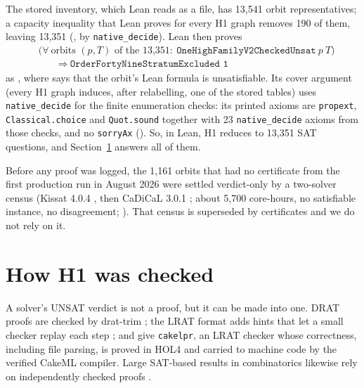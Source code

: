 \documentclass{anvil-paper}
\newcommand{\repocommit}{2029149d7e42b74036ff0e1e82af6d33c2e32748}%
\newcommand{\repocommitshort}{2029149d7e42}
\newcommand{\repobase}{https://github.com/rjwalters/lean-genius/blob/\repocommit}
\newcommand{\repofile}[2]{\href{\repobase/#1}{\lean{#2}}}
\newcommand{\rp}{research/problems/erdos-85-wip-01}
\newcommand{\cakelpr}{\texttt{cake\textunderscore lpr}}
\theoremstyle{definition}
\begin{document}
The stored inventory, which Lean reads as a file, has 13,541 orbit representatives; a capacity inequality that Lean proves for every H1 graph removes 190 of them, leaving 13,351 (, by \texttt{native\_decide}). Lean then proves
\[
\begin{aligned}
&\bigl(\forall\ \text{orbits } (p,T) \text{ of the 13,351}:\ \texttt{OneHighFamilyV2CheckedUnsat}\ p\ T\bigr)\\
&\qquad\Longrightarrow\ \texttt{OrderFortyNineStratumExcluded 1}
\end{aligned}
\]
as , where  says that the orbit's Lean formula is unsatisfiable. Its cover argument (every H1 graph induces, after relabelling, one of the stored tables) uses \texttt{native\_decide} for the finite enumeration checks: its printed axioms are \texttt{propext}, \texttt{Classical.choice} and \texttt{Quot.sound} together with 23 \texttt{native\_decide} axioms from those checks, and no \texttt{sorryAx} (\repofile{\rp/h1_cert_pilot_20261001/H1_COVER_AXIOMS_20261006.txt}{H1_COVER_AXIOMS_20261006.txt}). So, in Lean, H1 reduces to 13,351 SAT questions, and Section~\ref{sec:h1} answers all of them.

Before any proof was logged, the 1,161 orbits that had no certificate from the first production run in August 2026 were settled verdict-only by a two-solver census (Kissat 4.0.4 \citep{biere2024kissat}, then CaDiCaL 3.0.1 \citep{biere2020cadical,biere2024cadical2}; about 5,700 core-hours, no satisfiable instance, no disagreement; \repofile{\rp/phase_b_h1_census_20260927/CENSUS.md}{CENSUS.md}). That census is superseded by certificates and we do not rely on it.

\section{How H1 was checked}\label{sec:h1}

A solver's UNSAT verdict is not a proof, but it can be made into one. DRAT proofs are checked by drat-trim \citep{wetzler2014drat}; the LRAT format adds hints that let a small checker replay each step \citep{cruzfilipe2017lrat}; and \citet{tan2021cakelpr} give \cakelpr{}, an LRAT checker whose correctness, including file parsing, is proved in HOL4 and carried to machine code by the verified CakeML compiler. Large SAT-based results in combinatorics likewise rely on independently checked proofs \citep{heule2016pythagorean,heule2018schur}.
\end{document}
